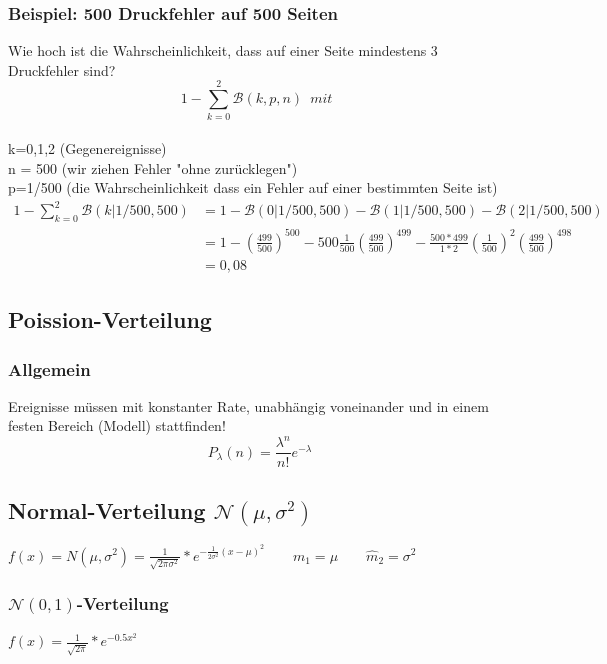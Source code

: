 \documentclass{article}
\begin{document}
\subsubsection{Beispiel: 500 Druckfehler auf 500 Seiten}
Wie hoch ist die Wahrscheinlichkeit, dass auf einer Seite mindestens 3 Druckfehler
sind?
\[
1- \sum_{k=0}^{2} \mathcal{B}(k,p,n) \enspace mit \enspace \] \\
k=0,1,2 (Gegenereignisse)\\ n = 500
(wir ziehen Fehler "ohne zur\"ucklegen") \\ p=1/500 (die Wahrscheinlichkeit dass
ein Fehler auf einer bestimmten Seite ist)\\
\begin{equation*}
	\begin{split}
		1- \sum_{k=0}^{2} \mathcal{B}(k|1/500,500)
		& = 1 - \mathcal{B}(0|1/500,500) - \mathcal{B}(1|1/500,500) - \mathcal{B}(2|1/500,500) \\
		& = 1 - \left( \frac{499}{500} \right) ^{500} - 500\frac{1}{500}\left(\frac{499}{500}\right)^{499} - \frac{500*499}{1*2}\left( \frac{1}{500} \right) ^2 \left( \frac{499}{500} \right) ^{498} \\ & = 0,08
	\end{split}
\end{equation*}
\subsection{Poission-Verteilung}
\subsubsection{Allgemein}
Ereignisse m\"ussen mit konstanter Rate, unabh\"angig voneinander und in einem festen 
Bereich (Modell) stattfinden!
\[
	P_{\lambda}(n) = \frac{\lambda ^n}{n!} e ^{- \lambda}
\]
\subsection{Normal-Verteilung $\mathcal{N}(\mu, \sigma^2)$}
$f(x) = N(\mu, \sigma^2) = \frac{1}{\sqrt{2\pi\sigma^2}}*e^{-\frac{1}{2\sigma^2}(x-		
\mu)^2} \quad \quad m_1 = \mu \quad \quad \widehat{m}_2=\sigma^2$
\subsubsection{$\mathcal{N}(0,1)$-Verteilung}
$f(x) = \frac{1}{\sqrt{2\pi}}*e^{-0.5x^2}$
\end{document}
